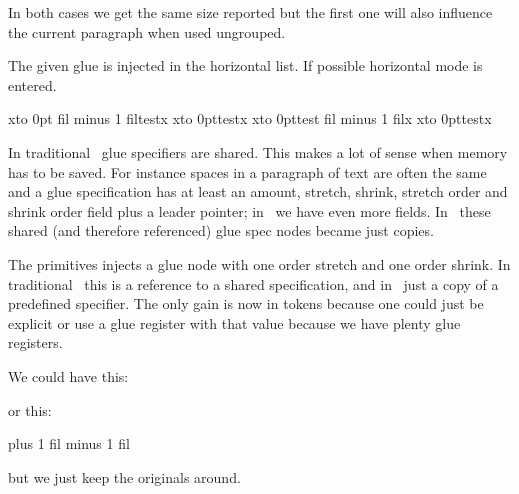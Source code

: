 \typebuffer

In both cases we get the same size reported but the first one will also influence
the current paragraph when used ungrouped.

\startlines
\getbuffer
\stoplines

\stopoldprimitive

\startoldprimitive[title={\prm {hskip}}]

The given glue is injected in the horizontal list. If possible horizontal mode is
entered.

\stopoldprimitive

\startoldprimitive[title={\prm {hss}}]

\startbuffer
x\hbox to 0pt{ fil minus 1 fil\relax test}x
x\hbox to 0pt{\hss test}x
x\hbox to 0pt{test fil minus 1 fil\relax}x
x\hbox to 0pt{test\hss}x
\stopbuffer

In traditional \TEX\ glue specifiers are shared. This makes a lot of sense when
memory has to be saved. For instance spaces in a paragraph of text are often the
same and a glue specification has at least an amount, stretch, shrink, stretch
order and shrink order field plus a leader pointer; in \LUAMETATEX\ we have even
more fields. In \LUATEX\ these shared (and therefore referenced) glue spec nodes
became just copies.

\typebuffer

The  primitives injects a glue node with one order stretch and one
order shrink. In traditional \TEX\ this is a reference to a shared specification,
and in \LUATEX\ just a copy of a predefined specifier. The only gain is now in
tokens because one could just be explicit or use a glue register with that value
because we have plenty glue registers.

\startlines
\getbuffer
\stoplines

We could have this:

\starttyping
\permanent\protected\untraced{}
\stoptyping

or this:

\starttyping
\gluespecdef\hssglue 0pt plus 1 fil minus 1 fil

\permanent\protected\untraced\def\hss
  {\hskip\hssglue}
\stoptyping

but we just keep the originals around.

\stopoldprimitive

\startoldprimitive[title={\prm {ht}}]

